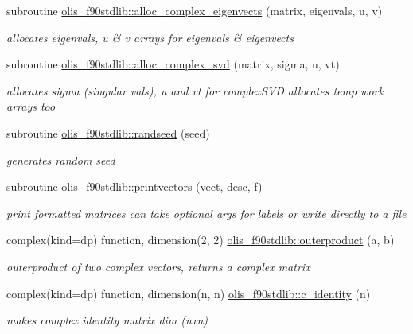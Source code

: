 \begin{DoxyCompactItemize}
\item 
subroutine \hyperlink{namespaceolis__f90stdlib_af0119bd404337367bc0727decf6dd89c}{olis\+\_\+f90stdlib\+::alloc\+\_\+complex\+\_\+eigenvects} (matrix, eigenvals, u, v)
\begin{DoxyCompactList}\small\item\em allocates eigenvals, u \& v arrays for eigenvals \& eigenvects \end{DoxyCompactList}\item 
subroutine \hyperlink{namespaceolis__f90stdlib_a31420ff7579f33919c00c26753b56612}{olis\+\_\+f90stdlib\+::alloc\+\_\+complex\+\_\+svd} (matrix, sigma, u, vt)
\begin{DoxyCompactList}\small\item\em allocates sigma (singular vals), u and vt for complex\+S\+VD  allocates temp work arrays too \end{DoxyCompactList}\item 
subroutine \hyperlink{namespaceolis__f90stdlib_a560e235cbabaf74da88a2ec97eda5628}{olis\+\_\+f90stdlib\+::randseed} (seed)
\begin{DoxyCompactList}\small\item\em generates random seed \end{DoxyCompactList}\item 
subroutine \hyperlink{namespaceolis__f90stdlib_a9780b39329025edfdef71ce07e250808}{olis\+\_\+f90stdlib\+::printvectors} (vect, desc, f)
\begin{DoxyCompactList}\small\item\em print formatted matrices  can take optional args for labels or write directly to a file \end{DoxyCompactList}\item 
complex(kind=dp) function, dimension(2, 2) \hyperlink{namespaceolis__f90stdlib_a9b646e61678500e78a9c48747a07bdf0}{olis\+\_\+f90stdlib\+::outerproduct} (a, b)
\begin{DoxyCompactList}\small\item\em outerproduct of two complex vectors, returns a complex matrix \end{DoxyCompactList}\item 
complex(kind=dp) function, dimension(n, n) \hyperlink{namespaceolis__f90stdlib_a2ff3837ae1f9273552a2716064a46fce}{olis\+\_\+f90stdlib\+::c\+\_\+identity} (n)
\begin{DoxyCompactList}\small\item\em makes complex identity matrix dim (nxn) \end{DoxyCompactList}\item 

\end{DoxyCompactItemize}
